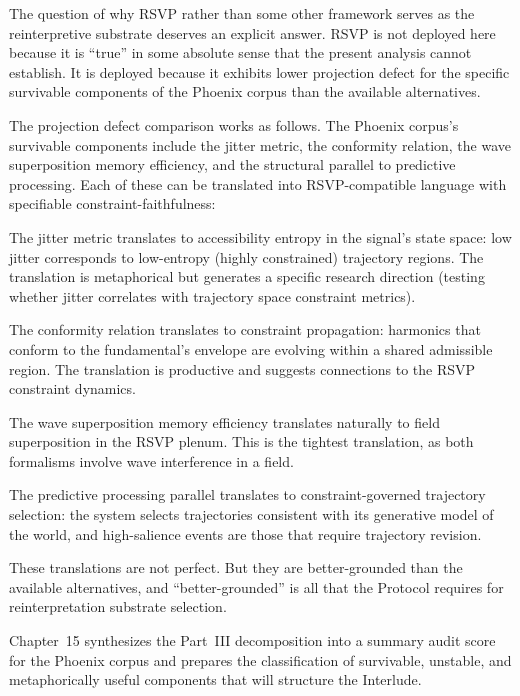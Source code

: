 The question of why RSVP rather than some other
framework serves as the reinterpretive substrate
deserves an explicit answer. RSVP is not deployed
here because it is ``true'' in some absolute sense
that the present analysis cannot establish. It is
deployed because it exhibits lower projection defect
for the specific survivable components of the Phoenix
corpus than the available alternatives.

The projection defect comparison works as follows.
The Phoenix corpus's survivable components include
the jitter metric, the conformity relation, the wave
superposition memory efficiency, and the structural
parallel to predictive processing. Each of these
can be translated into RSVP-compatible language with
specifiable constraint-faithfulness:

The jitter metric translates to accessibility entropy
in the signal's state space: low jitter corresponds
to low-entropy (highly constrained) trajectory regions.
The translation is metaphorical but generates a
specific research direction (testing whether jitter
correlates with trajectory space constraint metrics).

The conformity relation translates to constraint
propagation: harmonics that conform to the fundamental's
envelope are evolving within a shared admissible region.
The translation is productive and suggests connections
to the RSVP constraint dynamics.

The wave superposition memory efficiency translates
naturally to field superposition in the RSVP plenum.
This is the tightest translation, as both formalisms
involve wave interference in a field.

The predictive processing parallel translates to
constraint-governed trajectory selection: the system
selects trajectories consistent with its generative
model of the world, and high-salience events are those
that require trajectory revision.

These translations are not perfect. But they are
better-grounded than the available alternatives,
and ``better-grounded'' is all that the \Ortyx{}
Protocol requires for reinterpretation substrate
selection.

\medskip

Chapter~15 synthesizes the Part~III decomposition
into a summary audit score for the Phoenix corpus
and prepares the classification of survivable,
unstable, and metaphorically useful components
that will structure the Interlude.
